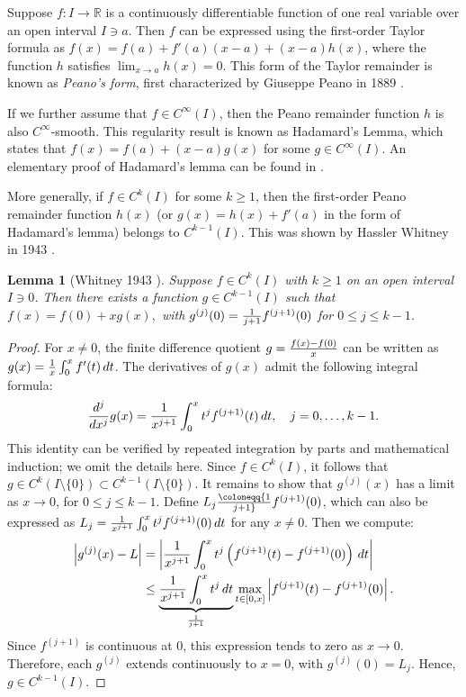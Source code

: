 \documentclass{article}
\theoremstyle{theorem}
\newtheorem{lemma}{Lemma}
\theoremstyle{definition}
\def\RR{\mathbb{R}}
\begin{document}
Suppose \(f\colon I\to\RR\) is a continuously differentiable function of one real variable over an open interval \(I\ni a\).  Then \(f\) can be expressed using the first-order Taylor formula as \(f(x) = f(a) + f'(a)(x-a) + (x-a)h(x)\), where the function \(h\) satisfies \(\lim_{x\to a}h(x) = 0\).  This form of the Taylor remainder is known as \emph{Peano's form}, first characterized by 
Giuseppe Peano in 1889 \cite{Peano:1889:UNF,Persson:2017:HST}.   

If we further assume that \(f\in C^\infty(I)\), then the Peano remainder function \(h\) is also \(C^\infty\)-smooth.  This regularity result is known as Hadamard's Lemma, which states that \(f(x) = f(a) + (x-a)g(x)\) for some \(g\in C^\infty(I)\).  An elementary proof of Hadamard's lemma can be found in \cite{Nestruev:2003:SMO}.

More generally, if \(f\in C^k(I)\) for some \(k\geq 1\), then the first-order Peano remainder function \(h(x)\) (or \(g(x) = h(x)+f'(a)\) in the form of Hadamard's lemma) belongs to \(C^{k-1}(I)\).  This was shown by Hassler Whitney in 1943 \cite{Whitney:1943:DRT}.

\begin{lemma}[Whitney 1943 \cite{Whitney:1943:DRT}]
\label{lemma:Whitney}
    Suppose \(f\in C^k(I)\) with \(k\geq 1\) on an open interval \(I\ni 0\).  Then there exists a function \(g\in C^{k-1}(I)\) such that
    \(
        f(x) = f(0) + xg(x),
    \)     
    with \(g^{(j)}(0) = {1\over j+1}f^{(j+1)}(0)\) for \(0\leq j\leq k-1\).
\end{lemma}
\begin{proof}
    For \(x\neq 0\), the finite difference quotient \(g = {f(x) - f(0)\over x}\) can be written as \(g(x) = {1\over x}\int_0^xf'(t)\, dt\).   The derivatives of \(g(x)\) admit the following integral formula:
    \begin{align*}
        {d^j\over dx^j}g(x) = {1\over x^{j+1}}\int_0^x t^j f^{(j+1)}(t)\, dt,\quad j=0,\ldots,k-1.
    \end{align*}
    This identity can be verified by repeated integration by parts and mathematical induction; we omit the details here.  
    Since \(f\in C^k(I)\), it follows that \(g\in C^k(I\setminus\{0\})\subset C^{k-1}(I\setminus\{0\})\).
    It remains to show that \(g^{(j)}(x)\) has a limit as \(x\to 0\), for \(0\leq j\leq k-1\).
    Define \(L_j \coloneqq {1\over j+1}f^{(j+1)}(0)\), which can also be expressed as \(L_j = {1\over x^{j+1}}\int_0^x t^jf^{(j+1)}(0)\, dt \) for any \(x\neq 0\).  Then we compute:
    \begin{align*}
        \left|g^{(j)}(x) - L\right| & = 
        \left|{1\over x^{j+1}}\int_0^x t^j\left(f^{(j+1)}(t) - f^{(j+1)}(0)\right)\, dt\right|\\
        &\leq \underbrace{{1\over x^{j+1}}\int_0^x t^j\, dt}_{{1\over j+1}} \max_{t\in [0,x]}\left|f^{(j+1)}(t) - f^{(j+1)}(0)\right|.
    \end{align*}
    Since \(f^{(j+1)}\) is continuous at \(0\), this expression tends to zero as \(x\to 0\).  Therefore, each \(g^{(j)}\) extends continuously to \(x=0\), with \(g^{(j)}(0) = L_j\).  Hence, \(g\in C^{k-1}(I)\).
\end{proof}
\end{document}
